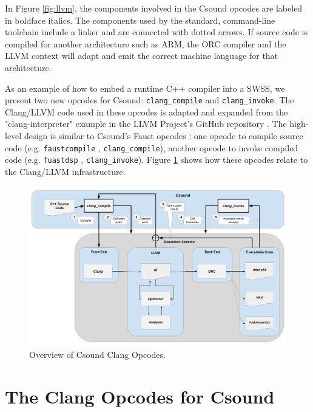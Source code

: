 \documentclass[letterpaper, 12pt]{article}
\begin{document}
In Figure \ref{fig:llvm}, the components involved in the Csound opcodes are labeled in boldface italics. The components used by the standard, command-line toolchain include a linker and are connected with dotted arrows. If source code is compiled for another architecture such as ARM, the ORC compiler and the LLVM context will adapt and emit the correct machine language for that architecture.

As an example of how to embed a runtime C++ compiler into a SWSS, we present two new opcodes for Csound: \texttt{clang\_compile} and \texttt{clang\_invoke}. The Clang/LLVM code used in these opcodes is adapted and expanded from the "clang-interpreter" example in the LLVM Project's GitHub repository \citep{clanginterpreter}. The high-level design is similar to Csound's Faust opcodes \citep{Lazzarini2014}: one opcode to compile source code (e.g. \texttt{faustcompile} \citep{faustcompile}, \texttt{clang\_compile}), another opcode to invoke compiled code (e.g. \texttt{fuastdsp} \citep{faustdsp}, \texttt{clang\_invoke}). Figure \ref{fig:clangopcodes} shows how these opcodes relate to the Clang/LLVM infrastructure.

\begin{figure}[]
\begin{center}
\includegraphics[width=\textwidth,height=\textheight,keepaspectratio]{EmbeddedCLangLLVMArchitecture}\caption{Overview of Csound Clang Opcodes.}
\label{fig:clangopcodes}
\end{center}
\end{figure}

\section{The Clang Opcodes for Csound}
\end{document}
